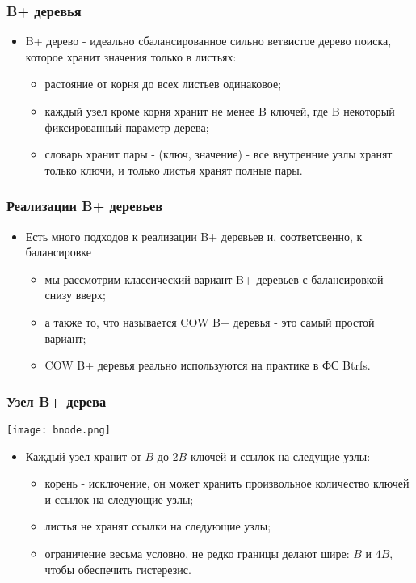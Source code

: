 \begin{frame}
\frametitle{B+ деревья}
\begin{itemize}
  \item B+ дерево - идеально сбалансированное сильно ветвистое дерево
  поиска, которое хранит значения только в листьях:
  \begin{itemize}
    \item растояние от корня до всех листьев одинаковое;
    \item каждый узел кроме корня хранит не менее B ключей, где B
    некоторый фиксированный параметр дерева;
    \item словарь хранит пары - (ключ, значение) - все внутренние узлы
    хранят только ключи, и только листья хранят полные пары.
  \end{itemize}
\end{itemize}
\end{frame}

\begin{frame}
\frametitle{Реализации B+ деревьев}
\begin{itemize}
  \item Есть много подходов к реализации B+ деревьев и, соответсвенно, к
  балансировке
  \begin{itemize}
    \item мы рассмотрим классический вариант B+ деревьев с балансировкой
    снизу вверх;
    \item а также то, что называется COW B+ деревья - это самый простой
    вариант;
    \item COW B+ деревья реально используются на практике в ФС Btrfs.
  \end{itemize}
\end{itemize}
\end{frame}

\begin{frame}
\frametitle{Узел B+ дерева}
\begin{center}
  \texttt{[image: bnode.png]}
\end{center}
\begin{itemize}
  \item Каждый узел хранит от $B$ до $2B$ ключей и ссылок на следущие узлы:
  \begin{itemize}
    \item корень - исключение, он может хранить произвольное количество
    ключей и ссылок на следующие узлы;
    \item листья не хранят ссылки на следующие узлы;
    \item ограничение весьма условно, не редко границы делают шире: $B$ и
    $4B$, чтобы обеспечить гистерезис.
  \end{itemize}
\end{itemize}
\end{frame}

